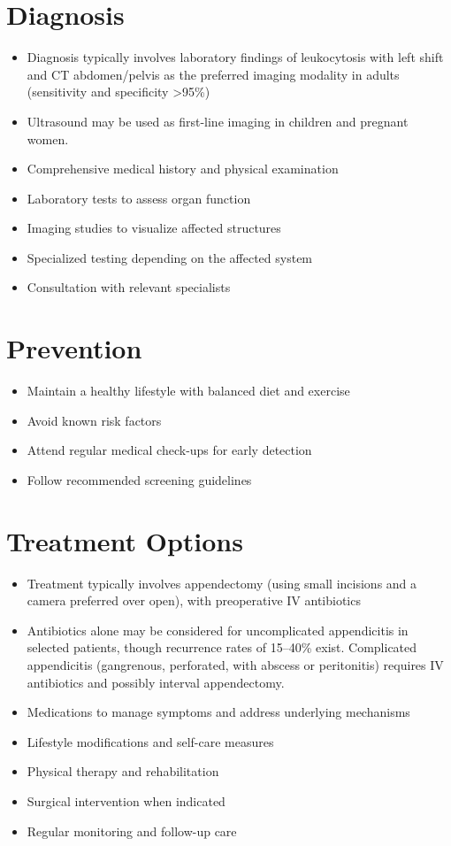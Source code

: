 \section{Diagnosis}
\begin{itemize}[noitemsep]
  \item Diagnosis typically involves laboratory findings of leukocytosis with left shift and CT abdomen/pelvis as the preferred imaging modality in adults (sensitivity and specificity >95\%)
  \item Ultrasound may be used as first-line imaging in children and pregnant women.
  \item Comprehensive medical history and physical examination
  \item Laboratory tests to assess organ function
  \item Imaging studies to visualize affected structures
  \item Specialized testing depending on the affected system
  \item Consultation with relevant specialists
\end{itemize}
\section{Prevention}
\begin{itemize}[noitemsep]
  \item Maintain a healthy lifestyle with balanced diet and exercise
  \item Avoid known risk factors
  \item Attend regular medical check-ups for early detection
  \item Follow recommended screening guidelines
\end{itemize}
\section{Treatment Options}
\begin{itemize}[noitemsep]
  \item Treatment typically involves appendectomy (using small incisions and a camera preferred over open), with preoperative IV antibiotics
  \item Antibiotics alone may be considered for uncomplicated appendicitis in selected patients, though recurrence rates of 15--40\% exist. Complicated appendicitis (gangrenous, perforated, with abscess or peritonitis) requires IV antibiotics and possibly interval appendectomy.
  \item Medications to manage symptoms and address underlying mechanisms
  \item Lifestyle modifications and self-care measures
  \item Physical therapy and rehabilitation
  \item Surgical intervention when indicated
  \item Regular monitoring and follow-up care
\end{itemize}
